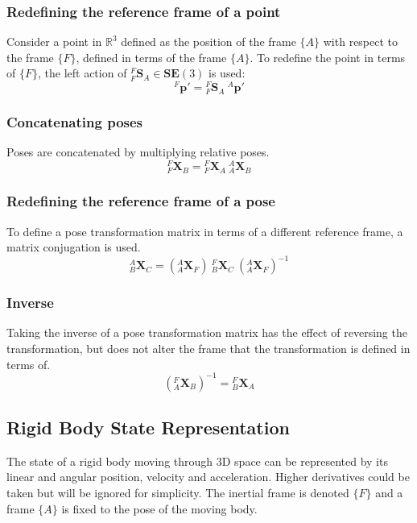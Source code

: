 		\subsubsection{Redefining the reference frame of a point}
		Consider a point in $\mathbb{R}^3$ defined as the position of the frame $\{A\}$ with respect to the frame $\{F\}$, defined in terms of the frame $\{A\}$. To redefine the point in terms of $\{F\}$, the left action of ${^{F}_{F}\mathbf{S}^{}_{A}} \in \mathbf{SE}(3)$ is used:
		\begin{equation}
			^{F}\mathbf{p'} = {^{F}_{F}\mathbf{S}^{}_{A}}\:^{A}\mathbf{p'}
		\end{equation}
		
		\subsubsection{Concatenating poses}
		Poses are concatenated by multiplying relative poses.
		\begin{equation}
			{^{F}_{F}\mathbf{X}^{}_{B}} = {^{F}_{F}\mathbf{X}^{}_{A}}\:{^{A}_{A}\mathbf{X}^{}_{B}}
		\end{equation}
		
		\subsubsection{Redefining the reference frame of a pose}
		To define a pose transformation matrix in terms of a different reference frame, a matrix conjugation is used.
		\begin{equation}
			{^{A}_{B}\mathbf{X}^{}_{C}} = ({^{A}_{A}\mathbf{X}^{}_{F}})\:{^{F}_{B}\mathbf{X}^{}_{C}}\:({^{A}_{A}\mathbf{X}^{}_{F}})^{-1}
		\end{equation}

		\subsubsection{Inverse}
		Taking the inverse of a pose transformation matrix has the effect of reversing the transformation, but does not alter the frame that the transformation is defined in terms of.
		\begin{equation}
			({^{F}_{A}\mathbf{X}^{}_{B}})^{-1} = {^{F}_{B}\mathbf{X}^{}_{A}}
		\end{equation}
	
	\subsection{Rigid Body State Representation} \label{state rep}
		The state of a rigid body moving through 3D space can be represented by its linear and angular position, velocity and acceleration. Higher derivatives could be taken but will be ignored for simplicity.
		The inertial frame is denoted $\{F\}$ and a frame $\{A\}$ is fixed to the pose of the moving body.
		
